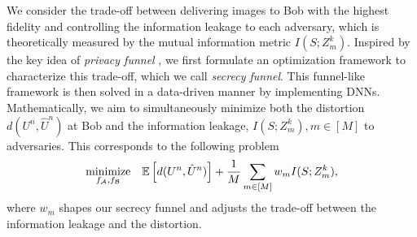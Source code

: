 \documentclass[conference]{IEEEtran}
\begin{document}
	We consider the trade-off between  delivering images
	to Bob with the highest fidelity and  controlling  the information leakage to each adversary, which  
	is theoretically 
	measured	by the mutual information metric  $I({S};{ Z}_m^k)$. 
Inspired by the key idea of \emph{privacy funnel} \cite{funnel},  we first formulate  an optimization   framework to characterize  this trade-off,  which we call \emph{secrecy funnel}. 
	This funnel-like framework is then  solved in a data-driven manner by implementing   DNNs.  
	Mathematically, we aim to simultaneously minimize both the distortion $d(U^n,\hat{U}^n)$ at Bob and the information leakage,  $I({S};{ Z}_m^k), m \in [M]$ to adversaries. 
	This corresponds to the following problem 
	\begin{align}\label{eq:P0}
		\underset{
			f_{\cal A},
			f_{\cal B}}{\text{minimize}}
		\quad 
		\mathbb{E}\left[d(U^n,\hat{U}^n)\right] + 
		\frac{1}{M}	\hspace{0mm}  \sum_{m \in [M]} w_m I({S};{ Z}_m^k),   
	\end{align}
where $w_m$  shapes our secrecy funnel and   adjusts the trade-off between  the information leakage and the distortion.     
\end{document}
